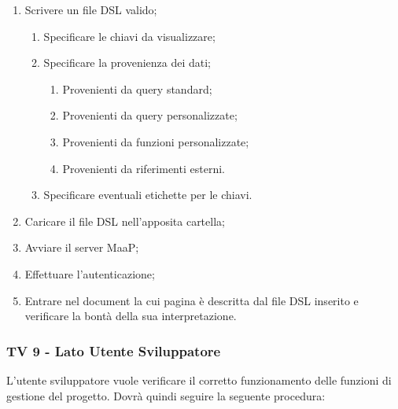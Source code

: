 \begin{enumerate}
\item Scrivere un file DSL valido;
\begin{enumerate}
\item Specificare le chiavi da visualizzare;
\item Specificare la provenienza dei dati;
\begin{enumerate}
\item Provenienti da query standard;
\item Provenienti da query personalizzate;
\item Provenienti da funzioni personalizzate;
\item Provenienti da riferimenti esterni.
\end{enumerate}
\item Specificare eventuali etichette per le chiavi.
\end{enumerate}
\item Caricare il file DSL nell'apposita cartella;
\item Avviare il server MaaP;
\item Effettuare l'autenticazione;
\item Entrare nel document la cui pagina è descritta dal file DSL inserito e verificare la bontà della sua interpretazione.
\end{enumerate}


\subsubsection{TV 9 - Lato Utente Sviluppatore}

L'utente sviluppatore vuole verificare il corretto funzionamento delle funzioni di gestione del progetto.
Dovrà quindi seguire la seguente procedura:

